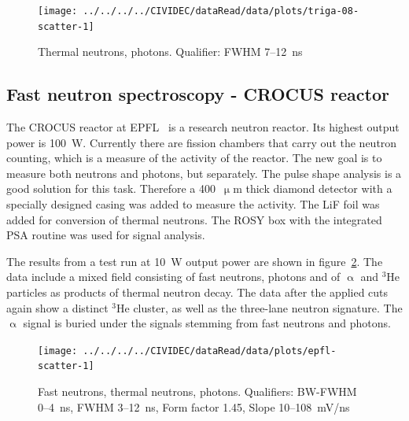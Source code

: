 \documentclass[12pt]{packages/mytustyle}  %
\begin{document}
\begin{figure}[!t]
\centering
\texttt{[image: ../../../../CIVIDEC/dataRead/data/plots/triga-08-scatter-1]}
\caption{Thermal neutrons, photons. Qualifier: FWHM 7--12~ns}
\label{fig:scattertriga1}
\end{figure}



\subsection{Fast neutron spectroscopy - CROCUS reactor}
The CROCUS reactor at EPFL~\cite{} is a research neutron reactor. Its highest output power is 100~W. Currently there are fission chambers that carry out the neutron counting, which is a measure of the activity of the reactor. The new goal is to measure both neutrons and photons, but separately. The pulse shape analysis is a good solution for this task.  Therefore a 400~$\upmu$m thick diamond detector with a specially designed casing was added to measure the activity. The LiF foil was added for conversion of thermal neutrons. The ROSY box with the integrated PSA routine was used for signal analysis.

The results from a test run at 10~W output power are shown in figure~\ref{fig:scatterepfl2}. The data include a mixed field consisting of fast neutrons, photons and of $\upalpha$ and $^3$He particles as products of thermal neutron decay. The data after the applied cuts again show a distinct $^3$He cluster, as well as the three-lane neutron signature. The $\upalpha$ signal is buried under the signals stemming from fast neutrons and photons.  


 
\clearpage
\begin{figure}[!t]
\centering
\texttt{[image: ../../../../CIVIDEC/dataRead/data/plots/epfl-scatter-1]}
\caption{Fast neutrons, thermal neutrons, photons. Qualifiers: BW-FWHM 0--4~ns, FWHM 3--12~ns, Form factor 1.45, Slope 10--108~mV/ns}
\label{fig:scatterepfl2}
\end{figure}


\clearpage
\end{document}
